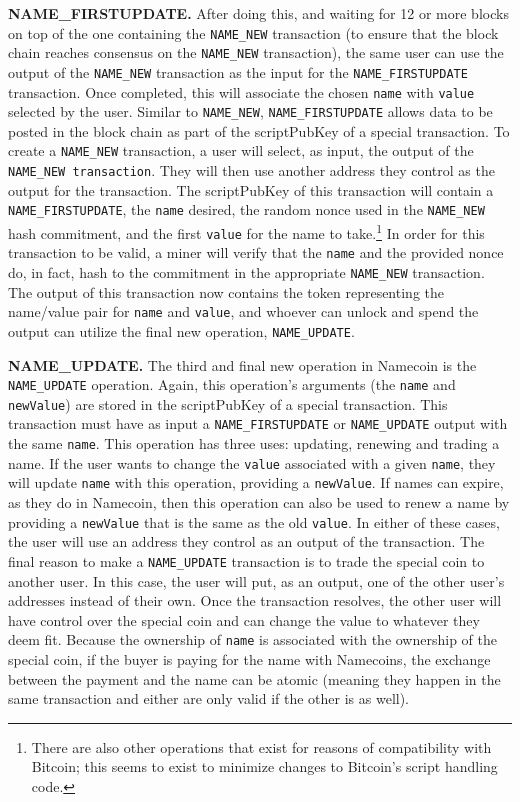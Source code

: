 {\bf NAME\_FIRSTUPDATE.}
After doing this, and waiting for 12 or more blocks on top of the one containing the {\tt NAME\_NEW} transaction (to ensure that the block chain reaches consensus on the {\tt NAME\_NEW} transaction), the same user can use the output of the {\tt NAME\_NEW} transaction as the input for the {\tt NAME\_FIRSTUPDATE} transaction. Once completed, this will associate the chosen {\tt name} with {\tt value} selected by the user. Similar to {\tt NAME\_NEW}, {\tt NAME\_FIRSTUPDATE} allows data to be posted in the block chain as part of the scriptPubKey of a special transaction. 
To create a {\tt NAME\_NEW} transaction, a user will select, as input, the output of the {\tt NAME\_NEW transaction}. They will then use another address they control as the output for the transaction. The scriptPubKey of this transaction will contain a {\tt NAME\_FIRSTUPDATE}, the {\tt name} desired, the random nonce used in the {\tt NAME\_NEW} hash commitment, and the first {\tt value} for the name to take.\footnote{There are also other operations that exist for reasons of compatibility with Bitcoin; this seems to exist to minimize changes to Bitcoin's script handling code.} 
In order for this transaction to be valid, a miner will verify that the {\tt name} and the provided nonce do, in fact, hash to the commitment in the appropriate {\tt NAME\_NEW} transaction. The output of this transaction now contains the token representing the name/value pair for {\tt name} and {\tt value}, and whoever can unlock and spend the output can utilize the final new operation, {\tt NAME\_UPDATE}.

{\bf NAME\_UPDATE.}
The third and final new operation in Namecoin is the {\tt NAME\_UPDATE} operation. Again, this operation's arguments (the {\tt name} and {\tt newValue}) are stored in the scriptPubKey of a special transaction. This transaction must have as input a {\tt NAME\_FIRSTUPDATE} or {\tt NAME\_UPDATE} output with the same {\tt name}. This operation has three uses: updating, renewing and trading a name. If the user wants to change the {\tt value} associated with a given {\tt name}, they will update {\tt name} with this operation, providing a {\tt newValue}. If names can expire, as they do in Namecoin, then this operation can also be used to renew a name by providing a {\tt newValue} that is the same as the old {\tt value}. In either of these cases, the user will use an address they control as an output of the transaction. The final reason to make a {\tt NAME\_UPDATE} transaction is to trade the special coin to another user. In this case, the user will put, as an output, one of the other user's addresses instead of their own. Once the transaction resolves, the other user will have control over the special coin and can change the value to whatever they deem fit. Because the ownership of {\tt name} is associated with the ownership of the special coin, if the buyer is paying for the name with Namecoins, the exchange between the payment and the name can be atomic (meaning they happen in the same transaction and either are only valid if the other is as well). 

